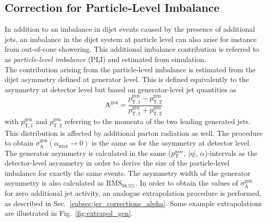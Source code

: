 \subsection{Correction for Particle-Level Imbalance}
\label{subsec:jer_corrections_pli}
In addition to an imbalance in dijet events caused by the presence of additional jets, an imbalance in the dijet system at particle level can also arise for instance from out-of-cone showering. This additional imbalance contribution is referred to as \textit{particle-level imbalance} (PLI) and estimated from simulation. \\
The contribution arising from the particle-level imbalance is estimated from the dijet asymmetry defined at generator level. This is defined equivalently to the asymmetry at detector level but based on generator-level jet quantities as
\begin{equation}
  \mathrm{A^{gen}} = \frac{p_\mathrm{T,1}^\mathrm{gen} - p_\mathrm{T,2}^\mathrm{gen}}{p_\mathrm{T,1}^\mathrm{gen} + p_\mathrm{T,2}^\mathrm{gen}} 
 \end{equation}
with $p_\mathrm{T,1}^\mathrm{gen}$ and $p_\mathrm{T,2}^\mathrm{gen}$ referring to the momenta of the two leading generated jets. This distribution is affected by additional parton radiation as well. The procedure to obtain $\sigma^\mathrm{gen}_\mathrm{A}(\alpha_\mathrm{max} \rightarrow 0)$ is the same as for the asymmetry at detector level. The generator asymmetry is calculated in the same ($p_{\text{T}}^\mathrm{ave}$, $|\eta|$, $\alpha$)-intervals as the detector-level asymmetry in order to derive the size of the particle-level imbalance for exactly the same events. The asymmetry width of the generator asymmetry is also calculated as $\mathrm{RMS}_{98.5\%}$. In order to obtain the values of $\sigma^\mathrm{gen}_\mathrm{A}$ for zero additional jet activity, an analogue extrapolation procedure is performed, as described in Sec.~\ref{subsec:jer_corrections_alpha}. Some example extrapolations are illustrated in Fig.~\ref{fig:extrapol_gen}. 
